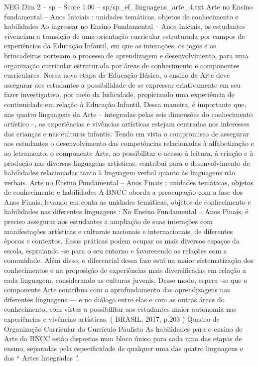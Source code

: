 \begin{textsample}{NEG Dim 2 – sp – Score 1.00 – sp/sp\_ef\_linguagens\_arte\_4.txt}  \label{ex:f2_neg_084}
Arte no Ensino fundamental – Anos Iniciais : unidades temáticas, objetos de conhecimento e habilidades Ao ingressar no Ensino Fundamental – Anos Iniciais, os estudantes vivenciam a transição de uma orientação curricular estruturada por campos de experiências da Educação Infantil, em que as interações, os jogos e as brincadeiras norteiam o processo de aprendizagem e desenvolvimento, para uma organização curricular estruturada por áreas de conhecimento e componentes curriculares.
Nessa nova etapa da Educação Básica, o ensino de Arte deve assegurar aos estudantes a possibilidade de se expressar criativamente em seu fazer investigativo, por meio da ludicidade, propiciando uma experiência de continuidade em relação à Educação Infantil.
Dessa maneira, é importante que, nas quatro linguagens da Arte – integradas pelas seis dimensões do conhecimento artístico –, as experiências e vivências artísticas estejam centradas nos interesses das crianças e nas culturas infantis.
Tendo em vista o compromisso de assegurar aos estudantes o desenvolvimento das competências relacionadas à alfabetização e ao letramento, o componente Arte, ao possibilitar o acesso à leitura, à criação e à produção nas diversas linguagens artísticas, contribui para o desenvolvimento de habilidades relacionadas tanto à linguagem verbal quanto às linguagens não verbais.
Arte no Ensino Fundamental – Anos Finais : unidades temáticas, objetos de conhecimento e habilidades A BNCC aborda a preocupação com a fase dos Anos Finais, levando em conta as unidades temáticas, objetos de conhecimento e habilidades nas diferentes linguagens : No Ensino Fundamental – Anos Finais, é preciso assegurar aos estudantes a ampliação de suas interações com manifestações artísticas e culturais nacionais e internacionais, de diferentes épocas e contextos.
Essas práticas podem ocupar os mais diversos espaços da escola, espraiando -se para o seu entorno e favorecendo as relações com a comunidade.
Além disso, o diferencial dessa fase está na maior sistematização dos conhecimentos e na proposição de experiências mais diversificadas em relação a cada linguagem, considerando as culturas juvenis.
Desse modo, espera -se que o componente Arte contribua com o aprofundamento das aprendizagens nas diferentes linguagens — e no diálogo entre elas e com as outras áreas do conhecimento, com vistas a possibilitar aos estudantes maior autonomia nas experiências e vivências artísticas. ( BRASIL, 2017, p.203 ) Quadro de Organização Curricular do Currículo Paulista As habilidades para o ensino de Arte da BNCC estão dispostas num bloco único para cada uma das etapas de ensino, separadas pela especificidade de qualquer uma das quatro linguagens e das “ Artes Integradas ”.

\end{textsample}
